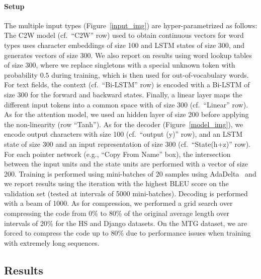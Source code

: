 \documentclass[11pt]{article}
\begin{document}
\paragraph{Setup} The multiple input types (Figure~\ref{input_img}) are
hyper-parametrized as follows: The C2W model (cf.~``C2W'' row) used to obtain
continuous vectors for word types uses character embeddings of size 100 and
LSTM states of size 300, and generates vectors of size 300. We also
report on results using word lookup tables of size 300, where we replace
singletons with a special unknown token with probability $0.5$ during training, which is then used for out-of-vocabulary words.
For text fields, the
context (cf.~``Bi-LSTM'' row) is encoded with a Bi-LSTM of size 300 for the
forward and backward states. Finally, a linear layer maps the different input tokens
into a common space with of size 300 (cf.~``Linear'' row). As for the attention model,
we used an hidden layer of size 200 before applying the non-linearity (row
``Tanh''). As for the decoder (Figure~\ref{model_img}), we encode
output characters with size 100 (cf.~``output (y)'' row), and an LSTM state of size 300
and an input representation of size 300 (cf.~``State(h+z)'' row). For each pointer network (e.g., ``Copy From Name'' box),
the intersection
between the input units and the state units are performed with a vector of size 200.
Training is performed using mini-batches of 20 samples using
AdaDelta~\cite{DBLP:journals/corr/abs-1212-5701} and we report results using the
iteration with the highest BLEU score on the validation set (tested at intervals
of 5000 mini-batches). Decoding is performed with a beam of 1000.
As for compression, we performed a grid search over
compressing the code from 0\% to 80\% of the original average length over
intervals of 20\% for the HS and Django datasets. On the MTG dataset, we are forced to
compress the code up to 80\% due to performance issues when training with extremely long sequences.

\subsection{Results}
\end{document}
